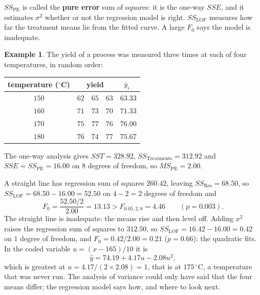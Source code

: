 \documentclass[11pt,a4paper]{article}
\numberwithin{equation}{section}
\theoremstyle{definition}
\newtheorem{exa}[thm]{Example}
\begin{document}
$SS_{\mathrm{PE}}$ is called the \textbf{pure error} sum of squares: it is the one-way $SSE$, and it estimates $\sigma^2$ whether or not the regression model is
right. $SS_{\mathrm{LOF}}$ measures how far the treatment means lie from the fitted curve. A large $F_0$ says the model is inadequate.

\begin{exa}\label{exa:temperature}
The yield of a process was measured three times at each of four temperatures, in random order:
\begin{center}
\begin{tabular}{c|ccc|c}
temperature ($^\circ$C) & \multicolumn{3}{c|}{yield} & $\bar y_{i\cdot}$ \\
\hline
$150$ & $62$ & $65$ & $63$ & $63.33$ \\
$160$ & $71$ & $73$ & $70$ & $71.33$ \\
$170$ & $75$ & $77$ & $76$ & $76.00$ \\
$180$ & $76$ & $74$ & $77$ & $75.67$
\end{tabular}
\end{center}
The one-way analysis gives $SST = 328.92$, $SS_{\mathrm{Treatments}} = 312.92$ and $SSE = SS_{\mathrm{PE}} = 16.00$ on $8$ degrees of freedom, so $MS_{\mathrm{PE}} = 2.00$.

A straight line has regression sum of squares $260.42$, leaving $SS_{\mathrm{Res}} = 68.50$, so $SS_{\mathrm{LOF}} = 68.50 - 16.00 = 52.50$ on $4 - 2 = 2$ degrees of freedom and
\[
F_0 = \frac{52.50/2}{2.00} = 13.13 > F_{0.05,2,8} = 4.46 \qquad (p = 0.003) .
\]
The straight line is inadequate: the means rise and then level off. Adding $x^2$ raises the regression sum of squares to $312.50$, so
$SS_{\mathrm{LOF}} = 16.42 - 16.00 = 0.42$ on $1$ degree of freedom, and $F_0 = 0.42/2.00 = 0.21$ ($p = 0.66$): the quadratic fits. In the coded variable
$u = (x - 165)/10$ it is
\[
\hat y = 74.19 + 4.17u - 2.08u^2 ,
\]
which is greatest at $u = 4.17/(2 \times 2.08) = 1$, that is at $175\,^\circ$C, a temperature that was never run. The analysis of variance could only have said
that the four means differ; the regression model says how, and where to look next.
\end{exa}
\end{document}
